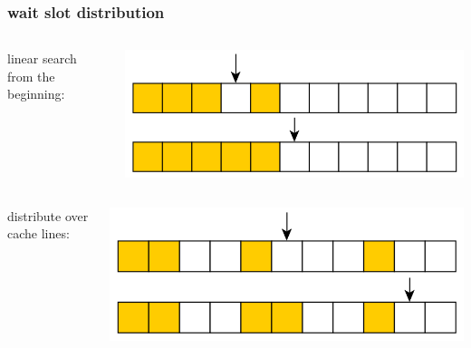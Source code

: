\documentclass{beamer}
\begin{document}
\begin{frame}
	\frametitle{wait slot distribution}
	\begin{center}
	
	\begin{columns}
		\begin{column}{0.28\textwidth}
			linear search from the beginning:	
		\end{column}
		\begin{column}{0.7\textwidth}
			\includegraphics[width=1.0\textwidth]{img/slot_compact.png}
		\end{column}
	\end{columns}
	\begin{columns}
		\begin{column}{0.28\textwidth}
			distribute over cache lines:
		\end{column}
		\begin{column}{0.7\textwidth}
			\includegraphics[width=1.0\textwidth]{img/slot_distributed.png}
		\end{column}
	\end{columns}
	\end{center}
\end{frame}
\end{document}
